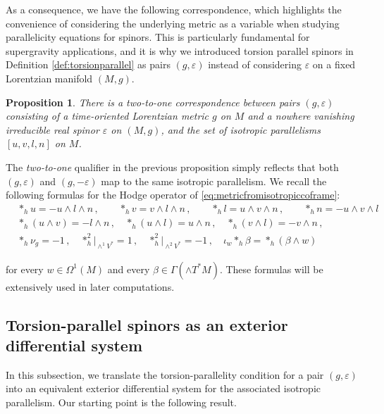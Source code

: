 \documentclass[10pt,reqno,a4paper]{amsart}
\theoremstyle{plain}
\newtheorem{prop}[thm]{Proposition}
\theoremstyle{definition}
\theoremstyle{remark}
\theoremstyle{remark}
\renewcommand{\(}{ (}
\renewcommand{\)}{ )}
\begin{document}
\noindent
As a consequence, we have the following correspondence, which highlights the convenience of considering the underlying metric as a variable when studying parallelicity equations for spinors. This is particularly fundamental for supergravity applications, and it is why we introduced torsion parallel spinors in Definition \ref{def:torsionparallel} as pairs $(g,\varepsilon)$ instead of considering $\varepsilon$ on a fixed Lorentzian manifold $(M,g)$.

\begin{prop}
There is a two-to-one correspondence between pairs $(g,\varepsilon)$ consisting of a time-oriented Lorentzian metric $g$ on $M$ and a nowhere vanishing irreducible real spinor $\varepsilon$ on $(M,g)$, and the set of isotropic parallelisms $[u,v,l,n]$ on $M$.
\end{prop}

\noindent
The \emph{two-to-one} qualifier in the previous proposition simply reflects that both $(g,\varepsilon)$ and $(g,-\varepsilon)$ map to the same isotropic parallelism. We recall the following formulas for the Hodge operator of \eqref{eq:metricfromisotropiccoframe}: 
\begin{eqnarray*}
& \ast_h u = -u\wedge l\wedge n \, , \qquad \ast_h v = v\wedge l\wedge n \, , \qquad \ast_h l = u\wedge v\wedge n \, , \qquad \ast_h n = - u\wedge v\wedge l\\
& \ast_h(u\wedge v) = - l\wedge n\, , \quad \ast_h(u\wedge l) = u\wedge n \, , \quad \ast_h(v\wedge l) = - v\wedge n\, , \\
& \ast_h \nu_g = -1\, , \quad \ast_h^2\vert_{\wedge^1 V^{\ast}} = 1\, , \quad \ast_h^2\vert_{\wedge^2 V^{\ast}} = - 1\, , \quad\iota_w \ast_h \beta = \ast_h(\beta\wedge w)  
\end{eqnarray*}

\noindent
for every $w\in \Omega^1(M)$ and every $\beta \in \Gamma(\wedge T^{\ast}M)$. These formulas will be extensively used in later computations.
 

%

\subsection{Torsion-parallel spinors as an exterior differential system}
\label{sec:torsion-spinor-characterization}

%

In this subsection, we translate the torsion-parallelity condition for a pair $(g,\varepsilon)$ into an equivalent exterior differential system for the associated isotropic parallelism. Our starting point is the following result.   
\end{document}
